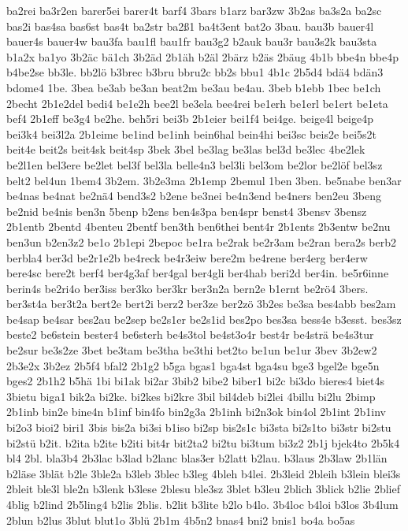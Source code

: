 {ba2rei
ba3r2en
barer5ei
barer4t
barf4
3bars
b1arz
bar3zw
3b2as
ba3s2a
ba2sc
bas2i
bas4sa
bas6st
bas4t
ba2str
ba2ß1
ba4t3ent
bat2o
3bau.
bau3b
bauer4l
bauer4s
bauer4w
bau3fa
bau1fl
bau1fr
bau3g2
b2auk
bau3r
bau3s2k
bau3sta
b1a2x
ba1yo
3b2äc
bä1ch
3b2äd
2b1äh
b2äl
2bärz
b2äs
2bäug
4b1b
bbe4n
bbe4p
b4be2se
bb3le.
bb2lö
b3brec
b3bru
bbru2c
bb2s
bbu1
4b1c
2b5d4
bdä4
bdän3
bdome4
1be.
3bea
be3ab
be3an
beat2m
be3au
be4au.
3beb
b1ebb
1bec
be1ch
2becht
2b1e2del
bedi4
be1e2h
bee2l
be3ela
bee4rei
be1erh
be1erl
be1ert
be1eta
bef4
2b1eff
be3g4
be2he.
beh5ri
bei3b
2b1eier
bei1f4
bei4ge.
beige4l
beige4p
bei3k4
bei3l2a
2b1eime
be1ind
be1inh
bein6hal
bein4hi
bei3sc
beis2e
bei5s2t
beit4e
beit2s
beit4sk
beit4sp
3bek
3bel
be3lag
be3las
bel3d
be3lec
4be2lek
be2l1en
bel3ere
be2let
bel3f
bel3la
belle4n3
bel3li
bel3om
be2lor
be2löf
bel3sz
belt2
bel4un
1bem4
3b2em.
3b2e3ma
2b1emp
2bemul
1ben
3ben.
be5nabe
ben3ar
be4nas
be4nat
be2nä4
bend3s2
b2ene
be3nei
be4n3end
be4ners
ben2eu
3beng
be2nid
be4nis
ben3n
5benp
b2ens
ben4s3pa
ben4spr
benst4
3bensv
3bensz
2b1entb
2bentd
4benteu
2bentf
ben3th
ben6thei
bent4r
2b1ents
2b3entw
be2nu
ben3un
b2en3z2
be1o
2b1epi
2bepoc
be1ra
be2rak
be2r3am
be2ran
bera2s
berb2
berbla4
ber3d
be2r1e2b
be4reck
be4r3eiw
bere2m
be4rene
ber4erg
ber4erw
bere4sc
bere2t
berf4
ber4g3af
ber4gal
ber4gli
ber4hab
beri2d
ber4in.
be5r6inne
berin4s
be2ri4o
ber3iss
ber3ko
ber3kr
ber3n2a
bern2e
b1ernt
be2rö4
3bers.
ber3st4a
ber3t2a
bert2e
bert2i
berz2
ber3ze
ber2zö
3b2es
be3sa
bes4abb
bes2am
be4sap
be4sar
bes2au
be2sep
be2s1er
be2s1id
bes2po
bes3sa
bess4e
b3esst.
bes3sz
beste2
be6stein
bester4
be6sterh
be4s3tol
be4st3o4r
best4r
be4strä
be4s3tur
be2sur
be3s2ze
3bet
be3tam
be3tha
be3thi
bet2to
be1un
be1ur
3bev
3b2ew2
2b3e2x
3b2ez
2b5f4
bfal2
2b1g2
b5ga
bgas1
bga4st
bga4su
bge3
bgel2e
bge5n
bges2
2b1h2
b5hä
1bi
bi1ak
bi2ar
3bib2
bibe2
biber1
bi2c
bi3do
bieres4
biet4s
3bietu
biga1
bik2a
bi2ke.
bi2kes
bi2kre
3bil
bil4deb
bi2lei
4billu
bi2lu
2bimp
2b1inb
bin2e
bine4n
b1inf
bin4fo
bin2g3a
2b1inh
bi2n3ok
bin4ol
2b1int
2b1inv
bi2o3
bioi2
biri1
3bis
bis2a
bi3si
b1iso
bi2sp
bis2s1c
bi3sta
bi2s1to
bi3str
bi2stu
bi2stü
b2it.
b2ita
b2ite
b2iti
bit4r
bit2ta2
bi2tu
bi3tum
bi3z2
2b1j
bjek4to
2b5k4
bl4
2bl.
bla3b4
2b3lac
b3lad
b2lanc
blas3er
b2latt
b2lau.
b3laus
2b3law
2b1län
b2läse
3blät
b2le
3ble2a
b3leb
3blec
b3leg
4bleh
b4lei.
2b3leid
2bleih
b3lein
blei3s
2bleit
ble3l
ble2n
b3lenk
b3lese
2blesu
ble3sz
3blet
b3leu
2blich
3blick
b2lie
2blief
4blig
b2lind
2b5ling4
b2lis
2blis.
b2lit
b3lite
b2lo
b4lo.
3b4loc
b4loi
b3los
3b4lum
2blun
b2lus
3blut
blut1o
3blü
2b1m
4b5n2
bnas4
bni2
bnis1
bo4a
bo5as
}
